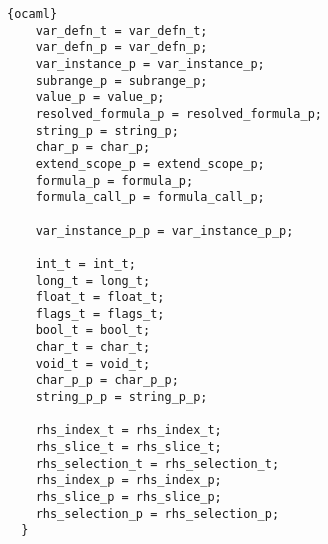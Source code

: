\begin{lstlisting}{ocaml}
    var_defn_t = var_defn_t;
    var_defn_p = var_defn_p;
    var_instance_p = var_instance_p;
    subrange_p = subrange_p;
    value_p = value_p;
    resolved_formula_p = resolved_formula_p;
    string_p = string_p;
    char_p = char_p;
    extend_scope_p = extend_scope_p;
    formula_p = formula_p;
    formula_call_p = formula_call_p;

    var_instance_p_p = var_instance_p_p;

    int_t = int_t;
    long_t = long_t;
    float_t = float_t;
    flags_t = flags_t;
    bool_t = bool_t;
    char_t = char_t;
    void_t = void_t;
    char_p_p = char_p_p;
    string_p_p = string_p_p;

    rhs_index_t = rhs_index_t;
    rhs_slice_t = rhs_slice_t;
    rhs_selection_t = rhs_selection_t;
    rhs_index_p = rhs_index_p;
    rhs_slice_p = rhs_slice_p;
    rhs_selection_p = rhs_selection_p;
  }
\end{lstlisting}
